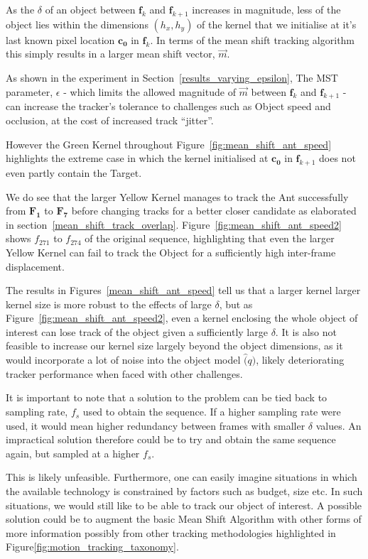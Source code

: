 As the $\delta$ of an object between $\mathbf{f}_k$ and $\mathbf{f}_{k+1}$ 
increases in magnitude, less of the object lies within the dimensions
$(h_x,h_y)$ of the kernel that we initialise at it's last known pixel location
$\mathbf{c_0}$ in $\mathbf{f}_k$. In terms of the mean shift tracking algorithm this simply
results in a larger mean shift vector, $\vec{m}$.

As shown in the experiment in Section~\ref{results_varying_epsilon}, The MST
parameter, $\epsilon$ - which limits the allowed magnitude of $\vec{m}$ between
$\mathbf{f}_{k}$ and $\mathbf{f}_{k+1}$ - can increase the tracker's tolerance
to challenges such as Object speed and occlusion, at the
cost of increased track ``jitter''. 

However the Green Kernel throughout Figure~\ref{fig:mean_shift_ant_speed}
highlights the extreme case in which the kernel initialised at $\mathbf{c_0}$ in
$\mathbf{f}_{k+1}$ does not even partly contain the Target.  

We do see that the larger Yellow Kernel manages to track the Ant successfully
from $\mathbf{F_1}$ to $\mathbf{F_7}$ before changing tracks for a better closer
candidate as elaborated in section~\ref{mean_shift_track_overlap}.
Figure~\ref{fig:mean_shift_ant_speed2} shows $f_{271}$ to $f_{274}$ of the original
sequence, highlighting that even the larger Yellow Kernel can fail to track the
Object for a sufficiently high inter-frame displacement.

The results in Figures~\ref{mean_shift_ant_speed} tell us
that a larger kernel larger kernel size is more robust to the effects of large
$\delta$, but as Figure~\ref{fig:mean_shift_ant_speed2}, even a
kernel enclosing the whole object of interest can lose track of the object given
a sufficiently large $\delta$. It is also not feasible to increase our kernel
size largely beyond the object dimensions, as it would incorporate a lot of
noise into the object model $\hat(q)$, likely deteriorating tracker performance
when faced with other challenges.

It is important to note that a solution to the problem can be tied back to
sampling rate, $f_s$ used to obtain the sequence. If a higher sampling rate were
used, it would mean higher redundancy between frames with smaller $\delta$
values. An impractical solution therefore could be to try and obtain the
same sequence again, but sampled at a higher $f_s$.

This is likely unfeasible. Furthermore, one can easily imagine situations in which the
available technology is constrained by factors such as budget, size etc. In such
situations, we would still like to be able to track our object of interest.  A
possible solution could be to augment the basic Mean Shift Algorithm with other
forms of more information possibly from other tracking methodologies highlighted
in Figure\ref{fig:motion_tracking_taxonomy}. 

